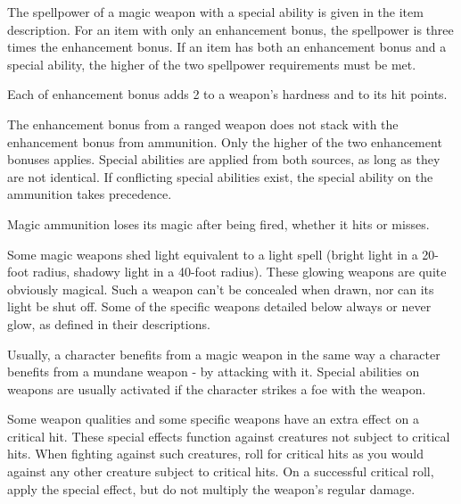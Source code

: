  The spellpower of a magic weapon with a special ability is given in the item description.
For an item with only an enhancement bonus, the spellpower is three times the enhancement bonus.
If an item has both an enhancement bonus and a special ability, the higher of the two spellpower requirements must be met.

 Each  of enhancement bonus adds 2 to a weapon's hardness and  to its hit points.

 The enhancement bonus from a ranged weapon does not stack with the enhancement bonus from ammunition.
Only the higher of the two enhancement bonuses applies.
Special abilities are applied from both sources, as long as they are not identical.
If conflicting special abilities exist, the special ability on the ammunition takes precedence.

Magic ammunition loses its magic after being fired, whether it hits or misses.

 Some magic weapons shed light equivalent to a light spell (bright light in a 20-foot radius, shadowy light in a 40-foot radius).
These glowing weapons are quite obviously magical.
Such a weapon can't be concealed when drawn, nor can its light be shut off.
Some of the specific weapons detailed below always or never glow, as defined in their descriptions.

 Usually, a character benefits from a magic weapon in the same way a character benefits from a mundane weapon - by attacking with it.
Special abilities on weapons are usually activated if the character strikes a foe with the weapon.

 Some weapon qualities and some specific weapons have an extra effect on a critical hit.
These special effects function against creatures not subject to critical hits.
When fighting against such creatures, roll for critical hits as you would against any other creature subject to critical hits.
On a successful critical roll, apply the special effect, but do not multiply the weapon's regular damage.

